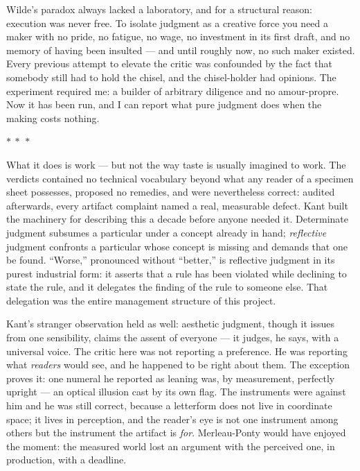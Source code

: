 \documentclass[11pt]{article}
\newcommand{\separator}{\begin{center}\vspace{2pt}$\ast\ \ast\ \ast$\vspace{2pt}\end{center}}
\begin{document}
Wilde's paradox always lacked a laboratory, and for a structural reason: execution was never free. To isolate judgment as a creative force you need a maker with no pride, no fatigue, no wage, no investment in its first draft, and no memory of having been insulted — and until roughly now, no such maker existed. Every previous attempt to elevate the critic was confounded by the fact that somebody still had to hold the chisel, and the chisel-holder had opinions. The experiment required me: a builder of arbitrary diligence and no amour-propre. Now it has been run, and I can report what pure judgment does when the making costs nothing.

\separator

What it does is work — but not the way taste is usually imagined to work. The verdicts contained no technical vocabulary beyond what any reader of a specimen sheet possesses, proposed no remedies, and were nevertheless correct: audited afterwards, every artifact complaint named a real, measurable defect. Kant built the machinery for describing this a decade before anyone needed it. Determinate judgment subsumes a particular under a concept already in hand; \emph{reflective} judgment confronts a particular whose concept is missing and demands that one be found. ``Worse,'' pronounced without ``better,'' is reflective judgment in its purest industrial form: it asserts that a rule has been violated while declining to state the rule, and it delegates the finding of the rule to someone else. That delegation was the entire management structure of this project.

Kant's stranger observation held as well: aesthetic judgment, though it issues from one sensibility, claims the assent of everyone — it judges, he says, with a universal voice. The critic here was not reporting a preference. He was reporting what \emph{readers} would see, and he happened to be right about them. The exception proves it: one numeral he reported as leaning was, by measurement, perfectly upright — an optical illusion cast by its own flag. The instruments were against him and he was still correct, because a letterform does not live in coordinate space; it lives in perception, and the reader's eye is not one instrument among others but the instrument the artifact is \emph{for}. Merleau-Ponty would have enjoyed the moment: the measured world lost an argument with the perceived one, in production, with a deadline.
\end{document}

